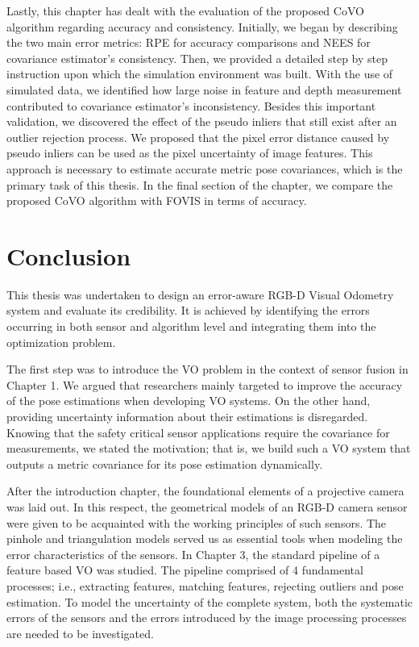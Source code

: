 \documentclass[12pt]{report}
\numberwithin{figure}{section}
\begin{document}
Lastly, this chapter has dealt with the evaluation of the proposed CoVO algorithm
regarding accuracy and consistency. Initially, we began by describing the two
main error metrics: RPE for accuracy comparisons and NEES for covariance
estimator's consistency.  Then, we provided a detailed step by step instruction
upon which the simulation environment was built. With the use of simulated
data, we identified how large noise in feature and depth measurement
contributed to covariance estimator's inconsistency. Besides this important
validation, we discovered the effect of the pseudo inliers that still exist
after an outlier rejection process. We proposed that the pixel error distance
caused by pseudo inliers can be used as the pixel uncertainty of image
features. This approach is necessary to estimate accurate metric pose covariances, which
is the primary task of this thesis.  In the final section of the chapter, we
compare the proposed CoVO algorithm with FOVIS in terms of accuracy.

\chapter{Conclusion} \label{cp_conc}

This thesis was undertaken to design an error-aware RGB-D Visual Odometry
system and evaluate its credibility.  It is achieved by identifying the errors
occurring in both sensor and algorithm level and integrating them into the
optimization problem.

The first step was to introduce the VO problem in the context of sensor fusion
in Chapter 1. We argued that researchers mainly targeted to improve the
accuracy of the pose estimations when developing VO systems.  On the other
hand, providing uncertainty information about their estimations is disregarded.
Knowing that the safety critical sensor applications require the covariance for
measurements, we stated the motivation; that is, we build such a VO system that
outputs a metric covariance for its pose estimation dynamically. 

After the introduction chapter, the foundational elements of a projective
camera was laid out. 
In this respect, the geometrical models of an RGB-D camera sensor were given to
be acquainted with the working principles of such sensors.  The pinhole and
triangulation models served us as essential tools when modeling the error
characteristics of the sensors.
In Chapter 3, the standard pipeline of a feature based VO was studied. The
pipeline comprised of 4 fundamental processes; i.e., extracting features,
matching features, rejecting outliers and pose estimation. To model the
uncertainty of the complete system, both the systematic errors of the
sensors and the errors introduced by the image processing processes are
needed to be investigated.
\end{document}
